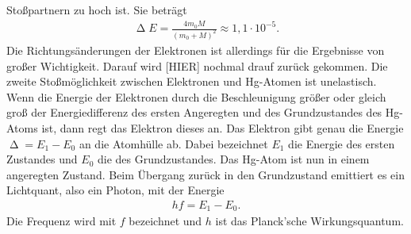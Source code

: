 Stoßpartnern zu hoch ist. Sie beträgt
\begin{align}
    \upDelta E = \frac{4 m_0 M}{(m_0 + M)^2} \approx 1,1 \cdot 10^{-5}.
\end{align}
Die Richtungsänderungen der Elektronen ist allerdings für die Ergebnisse von großer Wichtigkeit. Darauf wird [HIER] nochmal drauf zurück gekommen.
Die zweite Stoßmöglichkeit zwischen Elektronen und Hg-Atomen ist unelastisch. Wenn die Energie der Elektronen durch die Beschleunigung größer oder gleich groß der Energiedifferenz des ersten Angeregten und des Grundzustandes des Hg-Atoms ist, dann regt das Elektron dieses an.
Das Elektron gibt genau die Energie $\upDelta = E_1 - E_0$ an die Atomhülle ab. Dabei bezeichnet $E_1$ die Energie des ersten Zustandes und $E_0$ die des Grundzustandes.
Das Hg-Atom ist nun in einem angeregten Zustand. Beim Übergang zurück in den Grundzustand emittiert es ein Lichtquant, also ein Photon, mit der Energie
\begin{align*}
    hf = E_1 - E_0.
\end{align*}
Die Frequenz wird mit $f$ bezeichnet und $h$ ist das Planck'sche Wirkungsquantum.